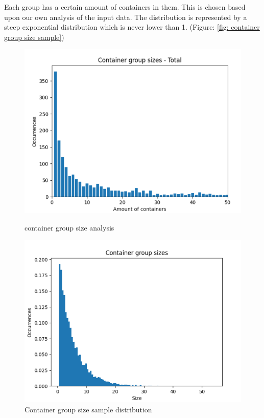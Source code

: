 \documentclass[]{article}
\begin{document}
Each group has a certain amount of containers in them. This is chosen based
upon our own analysis of the input data. The distribution is represented by a
steep exponential distribution which is never lower than 1. (Figure: \ref{fig:
	container group size sample})
\begin{figure}[!tbp]
	\centering
	\begin{minipage}[b]{0.45\textwidth}
		\includegraphics[width=\textwidth]{Afbeeldingen/container_group_sizes.png}
		\caption{container group size analysis}
	\end{minipage}
	\hfill
	\begin{minipage}[b]{0.44\textwidth}
		\includegraphics[width=\textwidth]{Afbeeldingen/container_group_size_sample.png}
		\caption{Container group size sample distribution}
		\label{fig:container group size sample}
	\end{minipage}
\end{figure}
\end{document}
